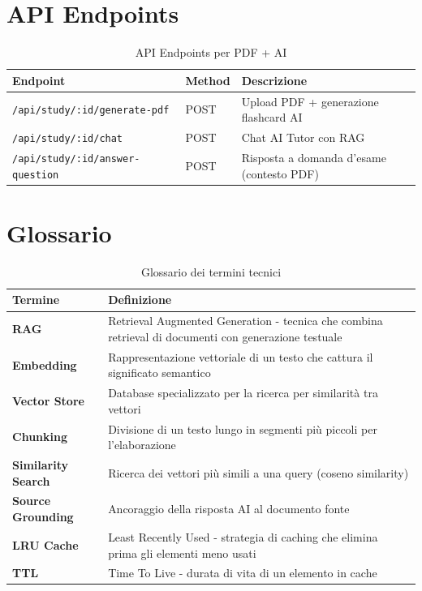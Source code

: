 \documentclass[11pt,a4paper]{article}
\begin{document}
\section{API Endpoints}

\begin{table}[h]
\centering
\begin{tabular}{llp{6cm}}
\toprule
\textbf{Endpoint} & \textbf{Method} & \textbf{Descrizione} \\
\midrule
\texttt{/api/study/:id/generate-pdf} & POST & Upload PDF + generazione flashcard AI \\
\texttt{/api/study/:id/chat} & POST & Chat AI Tutor con RAG \\
\texttt{/api/study/:id/answer-question} & POST & Risposta a domanda d'esame (contesto PDF) \\
\bottomrule
\end{tabular}
\caption{API Endpoints per PDF + AI}
\end{table}

\section{Glossario}

\begin{table}[h]
\centering
\begin{tabular}{lp{9cm}}
\toprule
\textbf{Termine} & \textbf{Definizione} \\
\midrule
\textbf{RAG} & Retrieval Augmented Generation - tecnica che combina retrieval di documenti con generazione testuale \\
\textbf{Embedding} & Rappresentazione vettoriale di un testo che cattura il significato semantico \\
\textbf{Vector Store} & Database specializzato per la ricerca per similarità tra vettori \\
\textbf{Chunking} & Divisione di un testo lungo in segmenti più piccoli per l'elaborazione \\
\textbf{Similarity Search} & Ricerca dei vettori più simili a una query (coseno similarity) \\
\textbf{Source Grounding} & Ancoraggio della risposta AI al documento fonte \\
\textbf{LRU Cache} & Least Recently Used - strategia di caching che elimina prima gli elementi meno usati \\
\textbf{TTL} & Time To Live - durata di vita di un elemento in cache \\
\bottomrule
\end{tabular}
\caption{Glossario dei termini tecnici}
\end{table}
\end{document}
